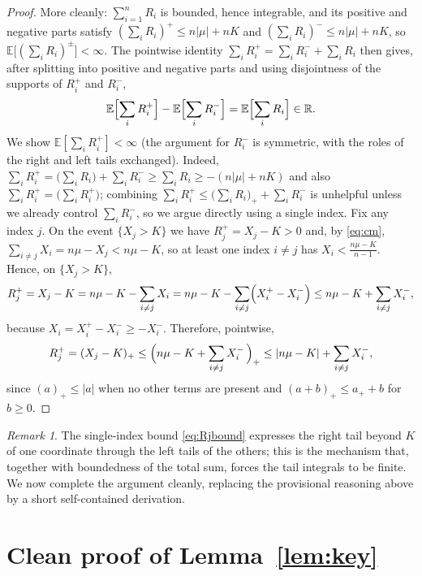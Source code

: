\documentclass{amsart}
\theoremstyle{definition}
\theoremstyle{remark}
\newtheorem{remark}{Remark}
\begin{document}
\begin{proof}
More cleanly: $\sum_{i=1}^n R_i$ is bounded, hence integrable, and its positive and negative
parts satisfy $(\sum_i R_i)^+\le n|\mu|+nK$ and $(\sum_i R_i)^-\le n|\mu|+nK$, so
$\mathbb{E}\bigl[(\sum_i R_i)^{\pm}\bigr]<\infty$. The pointwise identity
$\sum_i R_i^+=\sum_i R_i^- + \sum_i R_i$ then gives, after splitting into positive and
negative parts and using disjointness of the supports of $R_i^+$ and $R_i^-$,
\begin{equation}\label{eq:finiteAB}
\mathbb{E}\Bigl[\sum_i R_i^+\Bigr]-\mathbb{E}\Bigl[\sum_i R_i^-\Bigr]
=\mathbb{E}\Bigl[\sum_i R_i\Bigr]\in\mathbb{R}.
\end{equation}
We show $\mathbb{E}[\sum_i R_i^+]<\infty$ (the argument for $R_i^-$ is symmetric, with the
roles of the right and left tails exchanged). Indeed,
$\sum_i R_i^+ = \bigl(\sum_i R_i\bigr)+\sum_i R_i^- \ge \sum_i R_i \ge -(n|\mu|+nK)$ and
also $\sum_i R_i^+ = \bigl(\sum_i R_i^+\bigr)$; combining $\sum_i R_i^+\le
\bigl(\sum_i R_i\bigr)_+ + \sum_i R_i^-$ is unhelpful unless we already control
$\sum_i R_i^-$, so we argue directly using a single index. Fix any index $j$. On the event
$\{X_j>K\}$ we have $R_j^+=X_j-K>0$ and, by \eqref{eq:cm},
$\sum_{i\ne j}X_i=n\mu-X_j<n\mu-K$, so at least one index $i\ne j$ has
$X_i<\frac{n\mu-K}{n-1}$. Hence, on $\{X_j>K\}$,
\[
R_j^+=X_j-K = n\mu-K-\sum_{i\ne j}X_i
= n\mu-K-\sum_{i\ne j}\Bigl(X_i^+-X_i^-\Bigr)
\le n\mu-K+\sum_{i\ne j}X_i^- ,
\]
because $X_i=X_i^+-X_i^-\ge -X_i^-$. Therefore, pointwise,
\begin{equation}\label{eq:Rjbound}
R_j^+=(X_j-K)_+\le \Bigl(n\mu-K+\sum_{i\ne j}X_i^-\,\Bigr)_+\le |n\mu-K|+\sum_{i\ne j}X_i^- ,
\end{equation}
since $(a)_+\le|a|$ when no other terms are present and $(a+b)_+\le a_++b$ for $b\ge0$.
\end{proof}

\begin{remark}
The single-index bound \eqref{eq:Rjbound} expresses the right tail beyond $K$ of one
coordinate through the left tails of the others; this is the mechanism that, together with
boundedness of the total sum, forces the tail integrals to be finite. We now complete the
argument cleanly, replacing the provisional reasoning above by a short self-contained
derivation.
\end{remark}

\section{Clean proof of Lemma~\ref{lem:key}}
\end{document}
